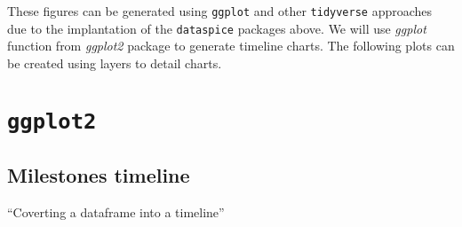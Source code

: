These figures can be generated using \texttt{ggplot} and other \texttt{tidyverse} approaches due to the implantation of the \texttt{dataspice} packages above. We will use \emph{ggplot} function from \emph{ggplot2} package to generate timeline charts. The following plots can be created using layers to detail charts.

\hypertarget{ggplot2}{%
\section{\texorpdfstring{\texttt{ggplot2}}{ggplot2}}\label{ggplot2}}

\hypertarget{milestones-timeline}{%
\subsection{Milestones timeline}\label{milestones-timeline}}

``Coverting a dataframe into a timeline''

